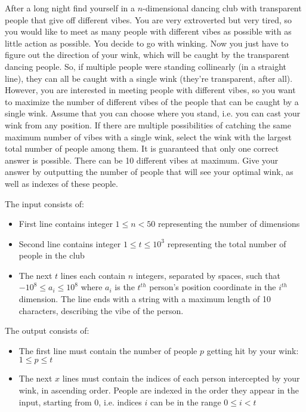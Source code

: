 \problemname{\problemyamlname}


\newcommand{\maxa}{123456789}

After a long night find yourself in a $n$-dimensional dancing club with transparent people that give off different vibes. 
You are very extroverted but very tired, so you would like to meet as many people with different vibes as possible with as little action as possible.
You decide to go with winking. Now you just have to figure out the direction of your wink, which will be caught by the transparent dancing people.
So, if multiple people were standing collinearly (in a straight line), they can all be caught with a single wink (they’re transparent, after all). However, you are interested in meeting people with different vibes, so you want to maximize the number of different vibes of the people that can be caught by a single wink. Assume that you can choose where you stand, i.e. you can cast your wink from any position.
If there are multiple possibilities of catching the same maximum number of vibes with a single wink, select the wink with the largest total number of people among them. It is guaranteed that only one correct answer is possible. There can be 10 different vibes at maximum.
Give your answer by outputting the number of people that will see your optimal wink, as well as indexes of these people.

\begin{Input}
    The input consists of:
    \begin{itemize}
        \item First line contains integer $ 1 \leq n < 50$ representing the number of dimensions
        \item Second line contains integer $ 1 \leq t \leq 10^3 $ representing the total number of people in the club
        \item The next $t$ lines each contain $n$ integers, separated by spaces, such that $ -10^8 \leq a_{i} \leq 10^8 $ where $a_i$ is the $t^{th}$ person’s position coordinate in the $i^{th}$ dimension. The line ends with a string with a maximum length of 10 characters, describing the vibe of the person.
    \end{itemize}
\end{Input}

\begin{Output}
    The output consists of:
    \begin{itemize}
        \item The first line must contain the number of people $p$ getting hit by your wink: $1 \leq p \leq t$
        \item The next $x$ lines must contain the indices of each person intercepted by your wink, in ascending order. People are indexed in the order they appear in the input, starting from 0, i.e. indices $i$ can be in the range $0 \leq i < t$
    \end{itemize}
\end{Output}
